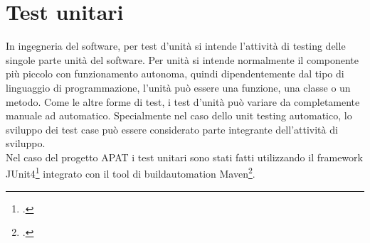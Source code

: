 \section{Test unitari}\label{sec:test-unitari}
In ingegneria del software, per test d'unità si intende l'attività di testing delle singole parte unità del software.
Per unità si intende normalmente il componente più piccolo con funzionamento autonoma, quindi dipendentemente dal tipo di linguaggio di programmazione, l'unità può essere una funzione, una classe o un metodo.
Come le altre forme di test, i test d'unità può variare da completamente manuale ad automatico.
Specialmente nel caso dello unit testing automatico, lo sviluppo dei test case può essere considerato parte integrante dell'attività di sviluppo.\\

Nel caso del progetto APAT i test unitari sono stati fatti utilizzando il framework JUnit4\footcite{site:junit4} integrato con il tool di \gls{buildautomation} Maven\footcite{site:maven}.
\setcounter{rowcount}{0}

